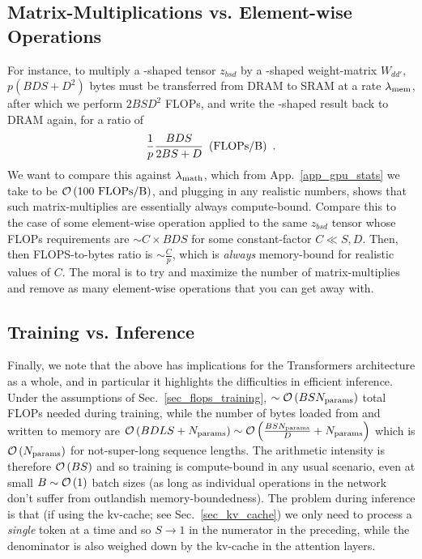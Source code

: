 \documentclass[11pt]{article}
\begin{document}
\subsection{Matrix-Multiplications vs. Element-wise Operations}

For instance, to multiply a -shaped tensor $ z _{ bsd } $ by a -shaped
weight-matrix $ W _{ d d' } $, $ p \left ( BDS +D ^{ 2 } \right ) $ bytes must be transferred from
DRAM to SRAM at a rate $ \lambda _{ {\rm  mem}  } $, after which we perform $ 2BSD ^{ 2 } $ FLOPs,
and write the -shaped  result back to DRAM again, for a ratio of
\begin{align}
    \frac{ 1 }{ p } \frac{ BDS }{ 2BS + D } \ \left ( {\rm FLOPs/B} \right )  \ .
\end{align}
We want to compare this against $ \lambda _{ {\rm math}  } $, which from
App.~\ref{app_gpu_stats} we take to be $ \mathcal{O} \left( 100\  {\rm FLOPs/B} \right)  $, and plugging
in any realistic numbers, shows that such matrix-multiplies are essentially always compute-bound.
Compare this to the case of some element-wise operation applied to the same $ z _{ bsd } $ tensor
whose FLOPs requirements are $ \sim C\times BDS $ for some constant-factor $ C \ll S, D $.  Then,
then FLOPS-to-bytes ratio is $ \sim \frac{ C }{ p } $, which is \textit{always} memory-bound for
realistic values of $ C $. The moral is to try and maximize the number of matrix-multiplies and
remove as many element-wise operations that you can get away with.


\subsection{Training vs. Inference}

Finally, we note that the above has implications for the Transformers architecture as a whole, and
in particular it highlights the difficulties in efficient inference. Under the assumptions of
Sec.~\ref{sec_flops_training}, $ \sim \mathcal{O} \left( BSN _{ {\rm params}  }  \right)  $
total FLOPs needed during training, while the number of bytes loaded from and written to memory are
$ \mathcal{O} \left( BDLS + N _{ {\rm params}  } \right)  \sim \mathcal{O} \left( \frac{ BS N _{ {\rm params}  } }{ D}+ N _{ {\rm params}  } \right)  $
which is $ \mathcal{O} \left( N _{ {\rm  params}  } \right)  $ for not-super-long sequence lengths.  The
arithmetic intensity is therefore $ \mathcal{O} \left( BS \right)  $ and so training is compute-bound in any
usual scenario, even at small $B \sim \mathcal{O} \left( 1 \right)  $ batch sizes (as long as individual operations in the network don't suffer from outlandish
memory-boundedness). The problem during inference is that (if using the kv-cache; see
Sec.~\ref{sec_kv_cache}) we only need to process a \textit{single} token at a time and so $ S
\longrightarrow 1 $ in the numerator in the preceding, while the denominator is also weighed down by
the  kv-cache in the attention layers.
\end{document}
